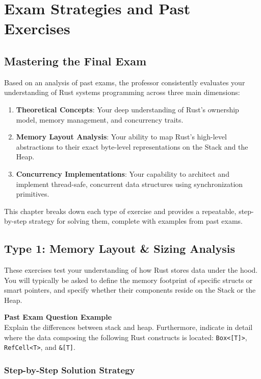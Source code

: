 \chapter{Exam Strategies and Past Exercises}

\section{Mastering the Final Exam}

Based on an analysis of past exams, the professor consistently evaluates your understanding of Rust systems programming across three main dimensions: 
\begin{enumerate}
    \item \textbf{Theoretical Concepts}: Your deep understanding of Rust's ownership model, memory management, and concurrency traits.
    \item \textbf{Memory Layout Analysis}: Your ability to map Rust's high-level abstractions to their exact byte-level representations on the Stack and the Heap.
    \item \textbf{Concurrency Implementations}: Your capability to architect and implement thread-safe, concurrent data structures using synchronization primitives.
\end{enumerate}

This chapter breaks down each type of exercise and provides a repeatable, step-by-step strategy for solving them, complete with examples from past exams.

\section{Type 1: Memory Layout \& Sizing Analysis}

These exercises test your understanding of how Rust stores data under the hood. You will typically be asked to define the memory footprint of specific structs or smart pointers, and specify whether their components reside on the Stack or the Heap.

\begin{exambox}
\textbf{Past Exam Question Example}\\
Explain the differences between stack and heap. Furthermore, indicate in detail where the data composing the following Rust constructs is located: \texttt{Box<[T]>}, \texttt{RefCell<T>}, and \texttt{\&[T]}.
\end{exambox}

\subsection*{Step-by-Step Solution Strategy}

